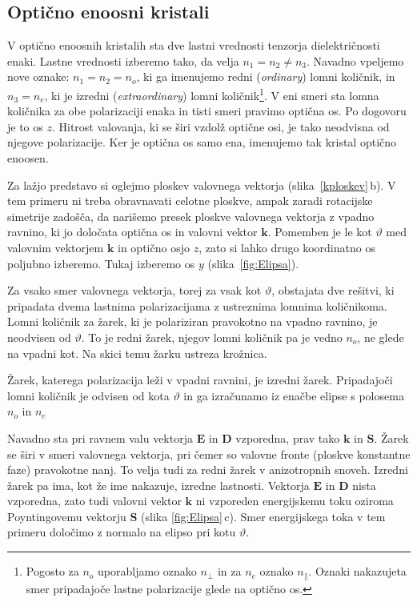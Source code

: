 \subsection*{Optično enoosni kristali}
V optično enoosnih kristalih sta dve lastni vrednosti tenzorja dielektričnosti 
enaki. Lastne vrednosti izberemo
tako, da velja $n_{1}=n_{2}\neq n_{3}$. Navadno vpeljemo nove 
oznake: $n_{1}=n_{2}=n_{o}$, ki ga imenujemo redni (\textit{ordinary})
lomni količnik, in $n_{3}=n_{e}$, ki je izredni 
(\textit{extraordinary}) lomni količnik\footnote{
Pogosto za $n_o$ uporabljamo oznako $n_{\perp}$ in za $n_e$ oznako $n_{\parallel}$. Oznaki
nakazujeta smer pripadajoče lastne polarizacije glede na optično os.}. 
V eni smeri sta lomna količnika za obe polarizaciji enaka in tisti smeri pravimo 
optična os. Po dogovoru je to os $z$. Hitrost valovanja, ki
se širi vzdolž optične osi, je tako neodvisna od njegove polarizacije.
Ker je optična os samo ena, imenujemo tak kristal optično enoosen. 

Za lažjo predstavo si oglejmo ploskev valovnega vektorja (slika~\ref{kploskev}\,b). 
V tem primeru ni treba obravnavati celotne ploskve, ampak zaradi rotacijske simetrije
zadošča, da narišemo presek ploskve valovnega vektorja z vpadno ravnino, ki jo določata 
optična os in valovni vektor $\mathbf{k}$. 
Pomemben je le kot $\vartheta$ med valovnim vektorjem $\mathbf{k}$ 
in optično osjo $z$, zato si lahko drugo koordinatno os poljubno izberemo. Tukaj izberemo
os $y$ (slika~\ref{fig:Elipsa}). 

Za vsako smer valovnega vektorja, torej za vsak kot $\vartheta$, obstajata dve rešitvi, 
ki pripadata dvema lastnima polarizacijama z ustreznima lomnima količnikoma. 
Lomni količnik za žarek, ki je polariziran pravokotno na vpadno ravnino, 
je neodvisen od $\vartheta$. To je redni žarek, njegov lomni količnik 
pa je vedno $n_o$, ne glede na vpadni kot. Na skici temu žarku ustreza krožnica.

Žarek, katerega polarizacija leži v vpadni ravnini, je izredni žarek. Pripadajoči
lomni količnik je odvisen od kota $\vartheta$ in 
ga izračunamo iz enačbe elipse s polosema $n_o$ in $n_e$ 

Navadno sta pri ravnem valu vektorja $\mathbf{E}$ in $\mathbf{D}$ vzporedna, 
prav tako $\mathbf{k}$ in $\mathbf{S}$. Žarek se širi v smeri valovnega vektorja, pri čemer
so valovne fronte (ploskve konstantne faze) pravokotne nanj. To velja tudi za redni žarek v anizotropnih
snoveh. Izredni žarek pa ima, kot že ime nakazuje, izredne lastnosti. Vektorja
$\mathbf{E}$ in $\mathbf{D}$ nista vzporedna, zato tudi valovni vektor $\mathbf{k}$ ni vzporeden
energijskemu toku oziroma Poyntingovemu vektorju $\mathbf{S}$ (slika \ref{fig:Elipsa}\,c). 
Smer energijskega toka v tem primeru določimo z normalo 
na elipso pri kotu $\vartheta$. 

